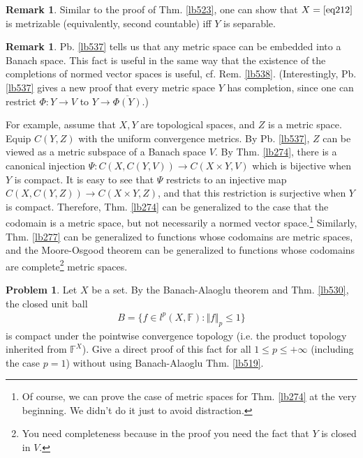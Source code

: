 \documentclass[12pt,b5paper,notitlepage]{article}
\theoremstyle{definition}
\newtheorem{rem}[df]{Remark}
\newtheorem{prob}{\color{red}Problem}[section]
\theoremstyle{plain}
\newcommand{\ovl}{\overline}
\newcommand{\Fbb}{\mathbb F}
\numberwithin{equation}{section}
\begin{document}
\begin{rem}
Similar to the proof of Thm. \ref{lb523}, one can show that $X=\eqref{eq212}$ is metrizable (equivalently, second countable) iff $Y$ is separable.
\end{rem}

\begin{rem}
Pb. \ref{lb537} tells us that any metric space can be embedded into a Banach space. This fact is useful in the same way that the existence of the completions of normed vector spaces is useful, cf. Rem. \ref{lb538}. (Interestingly, Pb. \ref{lb537} gives a new proof that every metric space $Y$ has completion, since one can restrict $\Phi:Y\rightarrow V$ to $Y\rightarrow\ovl{\Phi(Y)}$.) 

For example, assume that $X,Y$ are topological spaces, and $Z$ is a metric space. Equip $C(Y,Z)$ with the uniform convergence metrics. By Pb. \ref{lb537}, $Z$ can be viewed as a metric subspace of a Banach space $V$. By Thm. \ref{lb274}, there is a canonical injection $\Psi:C(X,C(Y,V))\rightarrow C(X\times Y,V)$ which is bijective when $Y$ is compact. It is easy to see that $\Psi$ restricts to an injective map $C(X,C(Y,Z))\rightarrow C(X\times Y,Z)$, and that this restriction is surjective when $Y$ is compact. Therefore, Thm. \ref{lb274} can be generalized to the case that the codomain is a metric space, but not necessarily a normed vector space.\footnote{Of course, we can prove the case of metric spaces for Thm. \ref{lb274} at the very beginning. We didn't do it just to avoid distraction.} Similarly, Thm. \ref{lb277} can be generalized to functions whose codomains are metric spaces, and the Moore-Osgood theorem can be generalized to functions whose codomains are complete\footnote{You need completeness because in the proof you need the fact that $Y$ is closed in $V$.} metric spaces.   \hfill\qedsymbol
\end{rem}








\begin{prob}\label{lb531}
Let $X$ be a set. By the Banach-Alaoglu theorem and Thm. \ref{lb530}, the closed unit ball
\begin{align}
B=\{f\in l^p(X,\Fbb):\Vert f\Vert_p\leq 1\}
\end{align}
is compact under the pointwise convergence topology (i.e. the product topology inherited from $\Fbb^X$). Give a direct proof of this fact for all $1\leq p\leq +\infty$ (including the case $p=1$) without using Banach-Alaoglu Thm. \ref{lb519}.
\end{prob}
\end{document}
